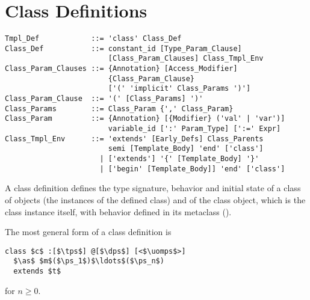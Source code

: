 \section{Class Definitions}
\label{sec:class-definitions}

\syntax\begin{lstlisting}
Tmpl_Def            ::= 'class' Class_Def
Class_Def           ::= constant_id [Type_Param_Clause] 
                        [Class_Param_Clauses] Class_Tmpl_Env
Class_Param_Clauses ::= {Annotation} [Access_Modifier] 
                        {Class_Param_Clause}
                        ['(' 'implicit' Class_Params ')']
Class_Param_Clause  ::= '(' [Class_Params] ')'
Class_Params        ::= Class_Param {',' Class_Param}
Class_Param         ::= {Annotation} [{Modifier} ('val' | 'var')]
                        variable_id [':' Param_Type] [':=' Expr]
Class_Tmpl_Env      ::= 'extends' [Early_Defs] Class_Parents
                        semi [Template_Body] 'end' ['class']
                      | ['extends'] '{' [Template_Body] '}'
                      | ['begin' [Template_Body]] 'end' ['class']
\end{lstlisting}

A class definition defines the type signature, behavior and initial state of a class of objects (the instances of the defined class) and of the class object, which is the class instance itself, with behavior defined in its metaclass (). 

The most general form of a class definition is
\begin{lstlisting}
class $c$ :[$\tps$] @[$\dps$] [<$\uomps$>] 
  $\as$ $m$($\ps_1$)$\ldots$($\ps_n$)
  extends $t$
\end{lstlisting}
for $n \geq 0$. 

